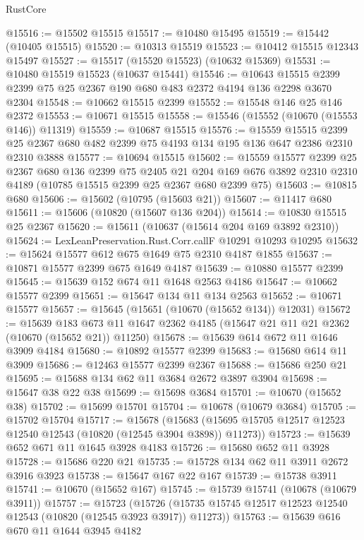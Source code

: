 \begin{lexlean}{RustCore}
\begin{coremodule}
@15516 := @15502 @15515
@15517 := @10480 @15495
@15519 := @15442 (@10405 @15515)
@15520 := @10313 @15519
@15523 := @10412 @15515 @12343 @15497
@15527 := @15517 (@15520 @15523) (@10632 @15369)
@15531 := @10480 @15519 @15523 (@10637 @15441)
@15546 := @10643 @15515 @2399 @2399 @75 @25 @2367 @190 @680 @483 @2372 @4194 @136 @2298 @3670 @2304
@15548 := @10662 @15515 @2399
@15552 := @15548 @146 @25 @146 @2372
@15553 := @10671 @15515
@15558 := @15546 (@15552 (@10670 (@15553 @146)) @11319)
@15559 := @10687 @15515
@15576 := @15559
    @15515
    @2399
    @25
    @2367
    @680
    @482
    @2399
    @75
    @4193
    @134
    @195
    @136
    @647
    @2386
    @2310
    @2310
    @3888
@15577 := @10694 @15515
@15602 := @15559
    @15577
    @2399
    @25
    @2367
    @680
    @136
    @2399
    @75
    @2405
    @21
    @204
    @169
    @676
    @3892
    @2310
    @2310
    @4189
    (@10785 @15515 @2399 @25 @2367 @680 @2399 @75)
@15603 := @10815 @680
@15606 := @15602 (@10795 (@15603 @21))
@15607 := @11417 @680
@15611 := @15606 (@10820 (@15607 @136 @204))
@15614 := @10830 @15515 @25 @2367
@15620 := @15611 (@10637 (@15614 @204 @169 @3892 @2310))
@15624 := LexLeanPreservation.Rust.Corr.callF @10291 @10293 @10295
@15632 := @15624 @15577 @612 @675 @1649 @75 @2310 @4187 @1855
@15637 := @10871 @15577 @2399 @675 @1649 @4187
@15639 := @10880 @15577 @2399
@15645 := @15639 @152 @674 @11 @1648 @2563 @4186
@15647 := @10662 @15577 @2399
@15651 := @15647 @134 @11 @134 @2563
@15652 := @10671 @15577
@15657 := @15645 (@15651 (@10670 (@15652 @134)) @12031)
@15672 := @15639
    @183
    @673
    @11
    @1647
    @2362
    @4185
    (@15647 @21 @11 @21 @2362 (@10670 (@15652 @21)) @11250)
@15678 := @15639 @614 @672 @11 @1646 @3909 @4184
@15680 := @10892 @15577 @2399
@15683 := @15680 @614 @11 @3909
@15686 := @12463 @15577 @2399 @2367
@15688 := @15686 @250 @21
@15695 := @15688 @134 @62 @11 @3684 @2672 @3897 @3904
@15698 := @15647 @38 @22 @38
@15699 := @15698 @3684
@15701 := @10670 (@15652 @38)
@15702 := @15699 @15701
@15704 := @10678 (@10679 @3684)
@15705 := @15702 @15704
@15717 := @15678
    (@15683 (@15695 @15705 @12517 @12523 @12540 @12543 (@10820 (@12545 @3904 @3898)) @11273))
@15723 := @15639 @652 @671 @11 @1645 @3928 @4183
@15726 := @15680 @652 @11 @3928
@15728 := @15686 @220 @21
@15735 := @15728 @134 @62 @11 @3911 @2672 @3916 @3923
@15738 := @15647 @167 @22 @167
@15739 := @15738 @3911
@15741 := @10670 (@15652 @167)
@15745 := @15739 @15741 (@10678 (@10679 @3911))
@15757 := @15723
    (@15726 (@15735 @15745 @12517 @12523 @12540 @12543 (@10820 (@12545 @3923 @3917)) @11273))
@15763 := @15639 @616 @670 @11 @1644 @3945 @4182

\end{coremodule}
\end{lexlean}
